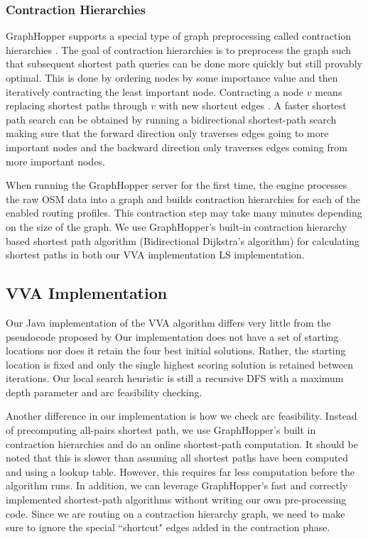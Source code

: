 \documentclass[11pt]{article}
\begin{document}
\subsubsection{Contraction Hierarchies}
GraphHopper supports a special type of graph preprocessing called contraction hierarchies \cite{graphhopper}. The goal of contraction hierarchies is to preprocess the graph such that subsequent shortest path queries can be done more quickly but still provably optimal. This is done by ordering nodes by some importance value and then iteratively contracting the least important node. Contracting a node $v$ means replacing shortest paths through $v$ with new shortcut edges \cite{geisberger2008contraction}. A faster shortest path search can be obtained by running a bidirectional shortest-path search making sure that the forward direction only traverses edges going to more important nodes and the backward direction only traverses edges coming from more important nodes.

When running the GraphHopper server for the first time, the engine processes the raw OSM data into a graph and builds contraction hierarchies for each of the enabled routing profiles. This contraction step may take many minutes depending on the size of the graph. We use GraphHopper's built-in contraction hierarchy based shortest path algorithm (Bidirectional Dijkstra's algorithm) for calculating shortest paths in both our VVA implementation LS implementation.

\subsection{VVA Implementation}
Our Java implementation of the VVA algorithm differs very little from the pseudocode proposed by \citeauthor{verbeeck2014extension} Our implementation does not have a set of starting locations nor does it retain the four best initial solutions. Rather, the starting location is fixed and only the single highest scoring solution is retained between iterations. Our local search heuristic is still a recursive DFS with a maximum depth parameter and arc feasibility checking.

Another difference in our implementation is how we check arc feasibility. Instead of precomputing all-pairs shortest path, we use GraphHopper's built in contraction hierarchies and do an online shortest-path computation. It should be noted that this is slower than assuming all shortest paths have been computed and using a lookup table. However, this requires far less computation before the algorithm runs. In addition, we can leverage GraphHopper's fast and correctly implemented shortest-path algorithms without writing our own pre-processing code. Since we are routing on a contraction hierarchy graph, we need to make sure to ignore the special ``shortcut" edges added in the contraction phase.
\end{document}

